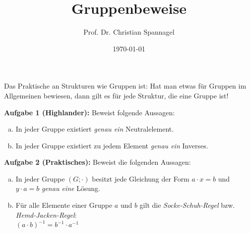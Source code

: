 \documentclass{cssheet}
\title{Gruppenbeweise}
\author{Prof. Dr. Christian Spannagel}
\date{\today}
\begin{document}
\printtitle

Das Praktische an Strukturen wie Gruppen ist: Hat man etwas für Gruppen im Allgemeinen bewiesen, dann gilt es für jede Struktur, die eine Gruppe ist!

\textbf{Aufgabe 1 (Highlander):}  Beweist folgende Aussagen:
\begin{enumerate}[a)]
\item In jeder Gruppe existiert \emph{genau ein} Neutralelement.
\item In jeder Gruppe existiert zu jedem Element \emph{genau ein} Inverses.
\end{enumerate}

\textbf{Aufgabe 2 (Praktisches):}  Beweist die folgenden Aussagen:
\begin{enumerate}[a)]

\item In jeder Gruppe $(G; \cdot)$ besitzt jede Gleichung der Form $a \cdot x = b$ und $y \cdot a = b$ \emph{genau eine} Lösung.
\item Für alle Elemente einer Gruppe $a$ und $b$ gilt die \emph{Socke-Schuh-Regel} bzw. \emph{Hemd-Jacken-Regel}:\\ $(a \cdot b)^{-1}=b^{-1}\cdot a^{-1}$
\end{enumerate}

\vspace*{2cm}
\printlicense

\printsocials
\end{document}
